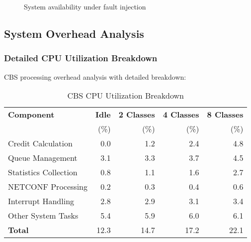 \documentclass[10pt, journal, compsoc]{IEEEtran}
\begin{document}
\begin{figure}[h]
\centering
{}
\caption{System availability under fault injection}
\label{fig:fault_tolerance}
\end{figure}

\subsection{System Overhead Analysis}

\subsubsection{Detailed CPU Utilization Breakdown}

CBS processing overhead analysis with detailed breakdown:

\begin{table}[h]
\centering
\caption{CBS CPU Utilization Breakdown}
\label{tab:cpu_breakdown}
\begin{tabular}{lrrrr}
\toprule
\textbf{Component} & \textbf{Idle} & \textbf{2 Classes} & \textbf{4 Classes} & \textbf{8 Classes} \\
 & (\%) & (\%) & (\%) & (\%) \\
\midrule
Credit Calculation & 0.0 & 1.2 & 2.4 & 4.8 \\
Queue Management & 3.1 & 3.3 & 3.7 & 4.5 \\
Statistics Collection & 0.8 & 1.1 & 1.6 & 2.7 \\
NETCONF Processing & 0.2 & 0.3 & 0.4 & 0.6 \\
Interrupt Handling & 2.8 & 2.9 & 3.1 & 3.4 \\
Other System Tasks & 5.4 & 5.9 & 6.0 & 6.1 \\
\midrule
\textbf{Total} & 12.3 & 14.7 & 17.2 & 22.1 \\
\bottomrule
\end{tabular}
\end{table}
\end{document}
